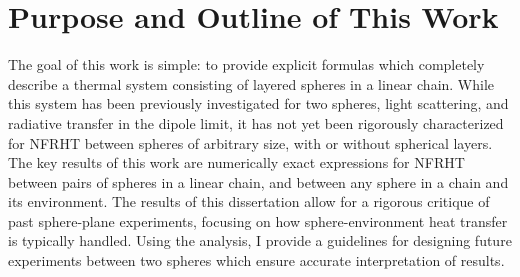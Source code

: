 %
%
%
%
%


\section{Purpose and Outline of This Work}
%
The goal of this work is simple: to provide explicit formulas which completely describe a thermal system consisting of layered spheres in a linear chain. While this system has been previously investigated for two spheres,\cite{Narayanaswamy2008, Mackowski2008, Sasihithlu2011, Sasihithlu2011a, Kruger2012, Sasihithlu2012, Sasihithlu2014} light scattering,\cite{Fuller1988, Li2003, Wei2004, Chen2006, Lee2013} and radiative transfer in the dipole limit,\cite{Ben-Abdallah2011, Dong2017a, Kathmann2018} it has not yet been rigorously characterized for NFRHT between spheres of arbitrary size, with or without spherical layers. The key results of this work are numerically exact expressions for NFRHT between pairs of spheres in a linear chain, and between any sphere in a chain and its environment. The results of this dissertation allow for a rigorous critique of past sphere-plane experiments, focusing on how sphere-environment heat transfer is typically handled. Using the analysis, I provide a guidelines for designing future experiments between two spheres which ensure accurate interpretation of results. 

